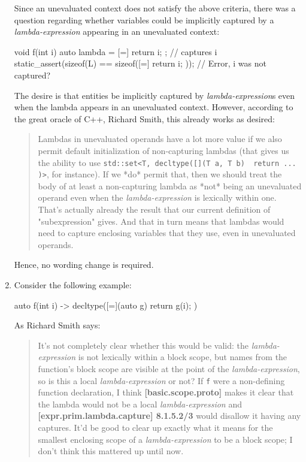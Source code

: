 \documentclass{wg21}
\newcommand{\cc}[1]{\texttt{#1}}
\begin{document}
\begin{enumerate}
    Since an unevaluated context does not satisfy the above criteria, there
    was a question regarding whether variables could be implicitly captured
    by a \textit{lambda-expression} appearing in an unevaluated context:
\begin{cpp}
void f(int i) {
  auto lambda = [=]{ return i; }; // captures i
  static_assert(sizeof(L) == sizeof([=]{ return i; })); // Error, i was not captured?
}
\end{cpp}

    The desire is that entities be implicitly captured by \textit{lambda-expression}s
    even when the lambda appears in an unevaluated context. However, according
    to the great oracle of C++, Richard Smith, this already works as desired:

    \begin{quote}
      Lambdas in unevaluated operands have a lot more value if we also permit
      default initialization of non-capturing lambdas (that gives us the ability
      to use \cc{std::set<T, decltype([](T a, T b) { return ... })>}, for
      instance). If we *do* permit that, then we should treat the body of at
      least a non-capturing lambda as *not* being an unevaluated operand even
      when the \textit{lambda-expression} is lexically within one. That's
      actually already the result that our current definition of "subexpression"
      gives. And that in turn means that lambdas would need to capture
      enclosing variables that they use, even in unevaluated operands.
    \end{quote}

    Hence, no wording change is required.

  \item \label{discussion.blockscope}
    Consider the following example:

\begin{cpp}
auto f(int i) -> decltype([=](auto g) { return g(i); }) { }
\end{cpp}

    As Richard Smith says:
    \begin{quote}
      It's not completely clear whether this would be valid: the
      \textit{lambda-expression} is not lexically within a block scope,
      but names from the function's block scope are visible at the point of
      the \textit{lambda-expression}, so is this a local \textit{lambda-expression}
      or not? If \cc{f} were a non-defining function declaration, I think
      \textbf{[basic.scope.proto]} makes it clear that the lambda would not
      be a local \textit{lambda-expression} and \textbf{[expr.prim.lambda.capture] 8.1.5.2/3}
      would disallow it having any captures. It'd be good to clear up exactly
      what it means for the smallest enclosing scope of a \textit{lambda-expression}
      to be a block scope; I don't think this mattered up until now.
    \end{quote}


\end{enumerate}
\end{document}
